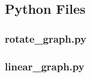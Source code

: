 \documentclass[a4paper, 12pt]{article}
\begin{document}
    \pagebreak
    \subsection{Python Files}
    \subsubsection{rotate\_graph.py}
    
    \pagebreak
    \subsubsection{linear\_graph.py}
    
\end{document}
